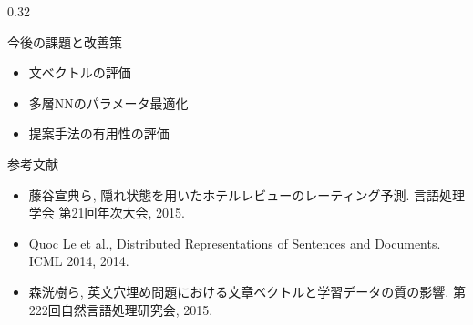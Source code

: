 \documentclass[10pt,unicode]{beamer}
\newcommand{\columnsize}{0.32}
\begin{document}
\begin{frame}{}
\begin{columns}[t]
\begin{column}{\columnsize\textwidth}
  \begin{block}{今後の課題と改善策}
    \begin{itemize}
    \item 文ベクトルの評価
    \item 多層NNのパラメータ最適化
    \item 提案手法の有用性の評価
    \end{itemize}
  \end{block} %

  参考文献 \\
  \begin{itemize}
  \item 藤谷宣典ら, 隠れ状態を用いたホテルレビューのレーティング予測.
  言語処理学会 第21回年次大会, 2015. \\
  \item Quoc Le et al., Distributed Representations of Sentences and Documents.
  ICML 2014, 2014. \\
  \item 森洸樹ら, 英文穴埋め問題における文章ベクトルと学習データの質の影響.
  第222回自然言語処理研究会, 2015.
  \end{itemize}
\end{column} %

\end{columns}
\end{frame}
\end{document}
